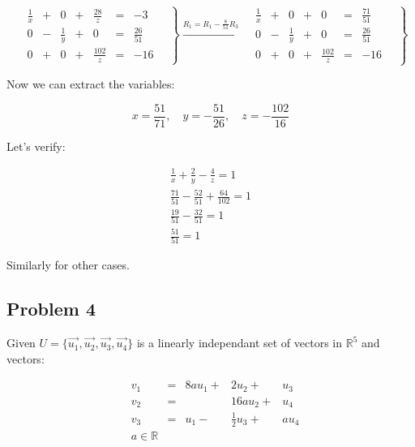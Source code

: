 \documentclass[11pt]{article}
\begin{document}
\begin{equation*}
  \left.
    \begin{alignedat}{5}
      &  \frac{1}{x} & {}+{} & 0           & {}+{} & \frac{28}{z}  & {}={} & -3 \\
      &  0           & {}-{} & \frac{1}{y} & {}+{} & 0             & {}={} & \frac{26}{51} \\
      &  0           & {}+{} & 0           & {}+{} & \frac{102}{z} & {}={} & -16
    \end{alignedat}
    \quad \right\}
  \xrightarrow{R_1 = R_1 - \frac{8}{51}R_3}
  \left.
    \begin{alignedat}{5}
      &  \frac{1}{x} & {}+{} & 0           & {}+{} & 0             & {}={} & \frac{71}{51} \\
      &  0           & {}-{} & \frac{1}{y} & {}+{} & 0             & {}={} & \frac{26}{51} \\
      &  0           & {}+{} & 0           & {}+{} & \frac{102}{z} & {}={} & -16
    \end{alignedat}
    \quad \right\}
\end{equation*}

Now we can extract the variables:

\begin{equation*}
  x = \frac{51}{71}, \quad
  y = -\frac{51}{26}, \quad
  z = -\frac{102}{16}
\end{equation*}

Let's verify:

\begin{equation*}
  \begin{split}
    \frac{1}{x} + \frac{2}{y} - \frac{4}{z} = 1 \\
    \frac{71}{51} - \frac{52}{51} + \frac{64}{102} = 1 \\
    \frac{19}{51} - \frac{32}{51} = 1 \\
    \frac{51}{51} = 1
  \end{split}
\end{equation*}

Similarly for other cases.
\subsection{Problem 4}
\label{sec-1-4}
Given $U = \{\vec{u_1}, \vec{u_2}, \vec{u_3}, \vec{u_4}\}$ is a linearly
independant set of vectors in $\mathbb{R}^5$ and vectors:

\begin{equation*}
  \begin{alignedat}{4}
    & v_1 & {}={} & 8au_1 {}+{} & 2u_2 {}+{}   & u_3 \\
    & v_2 & {}={} &             & 16au_2 {}+{}                        & u_4 \\
    & v_3 & {}={} & u_1 {}-{}                  & \frac{1}{2}u_3 {}+{} & au_4 \\
    & a \in \mathbb{R}
  \end{alignedat}
\end{equation*}
\end{document}
